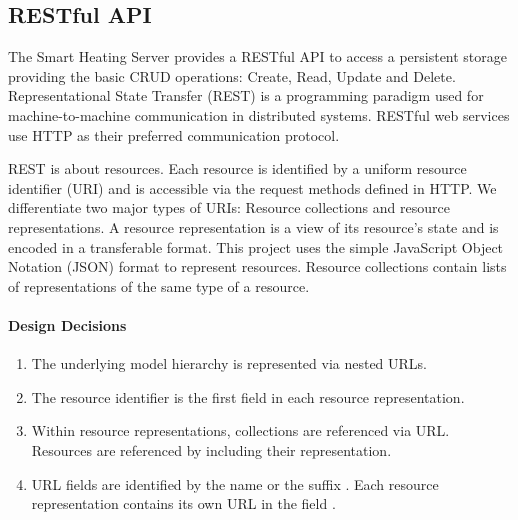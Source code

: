 \subsection{RESTful API}
\label{sec:server_infrastructure_restful_api}

The Smart Heating Server provides a RESTful API to access a persistent storage providing the basic CRUD operations: Create, Read, Update and Delete.
Representational State Transfer (REST) is a programming paradigm used for machine-to-machine communication in distributed systems.
RESTful web services use HTTP as their preferred communication protocol.

REST is about resources.
Each resource is identified by a uniform resource identifier (URI) and is accessible via the request methods defined in HTTP.
We differentiate two major types of URIs: Resource collections and resource representations.
A resource representation is a view of its resource's state and is encoded in a transferable format.
This project uses the simple JavaScript Object Notation (JSON) format to represent resources.
Resource collections contain lists of representations of the same type of a resource.

\paragraph{Design Decisions}

\begin{enumerate}
    \itemsep0em
    \item The underlying model hierarchy is represented via nested URLs.
    \label{enum:design_decision_nested_urls}
    
    \item The resource identifier is the first field in each resource representation.
    \label{enum:design_decision_identifier_first_field}
    
    \item Within resource representations, collections are referenced via URL. Resources are referenced by including their representation.
    \label{enum:design_decision_resource_referencing}
    
    \item URL fields are identified by the name  or the suffix . Each resource representation contains its own URL in the field .
    \label{enum:design_decision_url_fields_prefix}
\end{enumerate}

